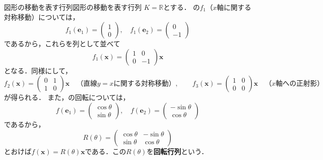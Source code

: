\begin{example}{図形の移動を表す行列}{図形の移動を表す行列}
  $K = \mathbb{R}$とする．
  の$f_1$（$x$軸に関する対称移動）については，
  \[
    f_1(\bm{e}_1) = \begin{pmatrix} 1 \\ 0 \end{pmatrix}, \quad
    f_1(\bm{e}_2) = \begin{pmatrix} 0 \\ -1 \end{pmatrix}
  \]
  であるから，これらを列として並べて
  \[
    f_1(\bm{x}) = \begin{pmatrix} 1 & 0 \\ 0 & -1 \end{pmatrix} \bm{x}
  \]
  となる．同様にして，
  \[
    f_2(\bm{x}) = \begin{pmatrix} 0 & 1 \\ 1 & 0 \end{pmatrix} \bm{x}
    \quad \text{（直線$y = x$に関する対称移動）}, \qquad
    f_3(\bm{x}) = \begin{pmatrix} 1 & 0 \\ 0 & 0 \end{pmatrix} \bm{x}
    \quad \text{（$x$軸への正射影）}
  \]
  が得られる．
  また，の回転については，
  \[
    f(\bm{e}_1) = \begin{pmatrix} \cos\theta \\ \sin\theta \end{pmatrix}, \quad
    f(\bm{e}_2) = \begin{pmatrix} -\sin\theta \\ \cos\theta \end{pmatrix}
  \]
  であるから，
  \[
    R(\theta) = \begin{pmatrix} \cos\theta & -\sin\theta \\ \sin\theta & \cos\theta \end{pmatrix}
  \]
  とおけば$f(\bm{x}) = R(\theta)\bm{x}$である．この$R(\theta)$を\textbf{回転行列}という．
\end{example}

